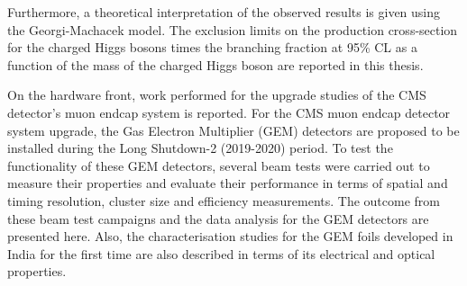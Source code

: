 Furthermore, a theoretical interpretation of the observed results is given using the Georgi-Machacek model. The exclusion limits on the production cross-section for the charged Higgs bosons times the branching fraction at 95\% CL as a function of the mass of the charged Higgs boson are reported in this thesis.

On the hardware front, work performed for the upgrade studies of the CMS detector's muon endcap system is reported. For the CMS muon endcap detector system upgrade, the Gas Electron Multiplier (GEM) detectors are proposed to be installed during the Long Shutdown-2 (2019-2020) period. To test the functionality of these GEM detectors, several beam tests were carried out to measure their properties and evaluate their performance in terms of spatial and timing resolution, cluster size and efficiency measurements. The outcome from these beam test campaigns and the data analysis for the GEM detectors are presented here. Also, the characterisation studies for the GEM foils developed in India for the first time are also described in terms of its electrical and optical properties.
